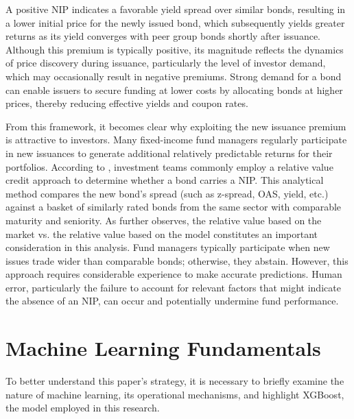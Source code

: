 A positive NIP indicates a favorable yield spread over similar bonds, resulting in a lower initial price for the newly issued bond, which subsequently yields greater returns as its yield converges with peer group bonds shortly after issuance. Although this premium is typically positive, its magnitude reflects the dynamics of price discovery during issuance, particularly the level of investor demand, which may occasionally result in negative premiums. Strong demand for a bond can enable issuers to secure funding at lower costs by allocating bonds at higher prices, thereby reducing effective yields and coupon rates.

From this framework, it becomes clear why exploiting the new issuance premium is attractive to investors. Many fixed-income fund managers regularly participate in new issuances to generate additional relatively predictable returns for their portfolios. According to \textcite[chap. 35]{Fabozzi2021TheEdition}, investment teams commonly employ a relative value credit approach to determine whether a bond carries a NIP. This analytical method compares the new bond's spread (such as z-spread, OAS, yield, etc.) against a basket of similarly rated bonds from the same sector with comparable maturity and seniority. As \textcite{Fabozzi2021TheEdition} further observes, the relative value based on the market vs. the relative value based on the model constitutes an important consideration in this analysis. Fund managers typically participate when new issues trade wider than comparable bonds; otherwise, they abstain. However, this approach requires considerable experience to make accurate predictions. Human error, particularly the failure to account for relevant factors that might indicate the absence of an NIP, can occur and potentially undermine fund performance.

\section{Machine Learning Fundamentals}

To better understand this paper's strategy, it is necessary to briefly examine the nature of machine learning, its operational mechanisms, and highlight XGBoost, the model employed in this research.

